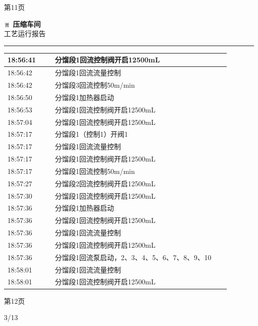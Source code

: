 \documentclass[UTF8,10pt,a4paper,fontset=fandol]{ctexart}
\newcommand{\handwritten}[1]{#1}
\begin{document}
\begin{center}
\begin{minipage}[t]{0.47\linewidth}
\vfill
第11页
\end{minipage}
\hfill
\begin{minipage}[t]{0.47\linewidth}
\centering
\textbf{※ 压缩车间}\\[-1mm]
工艺运行报告

\vspace{1mm}
\hrule
\vspace{1mm}

\scriptsize
\begin{tabular}{|p{0.19\linewidth}|p{0.70\linewidth}|}
\hline
18:56:41 & 分馏段1回流控制阀开启12500mL \\ \hline
18:56:42 & 分馏段1回流流量控制 \\ \hline
18:56:42 & 分馏段3回流控制50m/min \\ \hline
18:56:50 & 分馏段1加热器启动 \\ \hline
18:56:53 & 分馏段1回流控制阀开启12500mL \\ \hline
18:57:04 & 分馏段1回流控制阀开启12500mL \\ \hline
18:57:17 & 分馏段1（控制1）开阀1 \\ \hline
18:57:17 & 分馏段1回流流量控制 \\ \hline
18:57:17 & 分馏段1回流控制阀开启12500mL \\ \hline
18:57:17 & 分馏段1回流控制50m/min \\ \hline
18:57:27 & 分馏段2回流控制阀开启12500mL \\ \hline
18:57:30 & 分馏段1回流控制阀开启12500mL \\ \hline
18:57:36 & 分馏段1加热器启动 \\ \hline
18:57:36 & 分馏段1回流控制阀开启12500mL \\ \hline
18:57:36 & 分馏段1回流流量控制 \\ \hline
18:57:36 & 分馏段1回流控制阀开启12500mL \\ \hline
18:57:36 & 分馏段1回流泵启动，2、3、4、5、6、7、8、9、10 \\ \hline
18:58:01 & 分馏段1回流流量控制 \\ \hline
18:58:01 & 分馏段1回流控制阀开启12500mL \\ \hline
\end{tabular}

\vfill
第12页

\handwritten{3/13}
\end{minipage}
\end{center}
\end{document}
